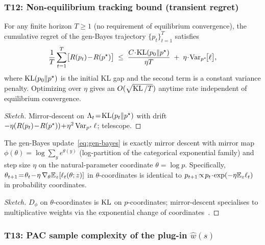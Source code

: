 \subsubsection{T12: Non-equilibrium tracking bound (transient regret)}
\label{app:t12-non-equilibrium}

\begin{theorem}
\label{thm:t12-non-equilibrium}
For any finite horizon $T\!\ge\!1$ (no requirement of equilibrium
convergence), the cumulative regret of the gen-Bayes trajectory
$\{p_t\}_{t=1}^{T}$ satisfies
\[
\frac{1}{T}\sum_{t=1}^{T}
\bigl[R(p_t)\!-\!R(p^\star)\bigr]
\;\le\;
\frac{C\!\cdot\!\operatorname{KL}(p_0\Vert p^\star)}{\eta T}
\;+\;
\eta\!\cdot\!\operatorname{Var}_{p^\star}\!\bigl[\ell\bigr],
\]
where $\operatorname{KL}(p_0\Vert p^\star)$ is the initial KL gap and the second
term is a constant variance penalty.  Optimizing over $\eta$
gives an $O(\sqrt{\operatorname{KL}/T})$ anytime rate independent of equilibrium
convergence.
\end{theorem}

\begin{proof}[Sketch]
Mirror-descent on $\Lambda_t\!=\!\operatorname{KL}(p_t\|p^\star)$ with drift
$-\eta(R(p_t)\!-\!R(p^\star))\!+\!\eta^2\operatorname{Var}_{p^\star}\ell$;
telescope.
\end{proof}

\begin{lemma}
\label{lem:gen-bayes-mirror}
The gen-Bayes update~\eqref{eq:gen-bayes} is exactly mirror descent
with mirror map $\phi(\theta)\!=\!\log\sum_y e^{\theta(y)}$
(log-partition of the categorical exponential family) and step
size $\eta$ on the natural-parameter coordinate
$\theta\!=\!\log p$.  Specifically,
$\theta_{t+1}\!=\!\theta_{t}\!-\!\eta\,\nabla_\theta\mathbb{E}_z[\ell_t(\theta;z)]$
in $\theta$-coordinates is identical to
$p_{t+1}\!\propto\!p_{t}\!\cdot\!\exp(-\eta\mathbb{E}_z\ell_t)$
in probability coordinates.
\end{lemma}

\begin{proof}[Sketch]
$D_\phi$ on $\theta$-coordinates is $\operatorname{KL}$ on $p$-coordinates;
mirror-descent specialises to multiplicative weights via the
exponential change of coordinates~\citep{beck2003mirror}.
\end{proof}

\subsubsection{T13: PAC sample complexity of the plug-in $\hat w(s)$}
\label{app:t13-pac-plugin}

